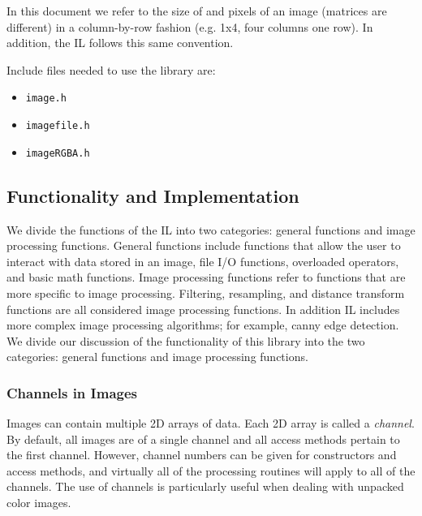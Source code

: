 In this document we refer to the size of and pixels of an image
(matrices are different) in a column-by-row fashion
(e.g. 1x4, four columns one row).
In addition, the IL follows this same convention.

Include files needed to use the library are:
\begin{itemize}
\item {\tt image.h}
\item {\tt imagefile.h}
\item {\tt imageRGBA.h}
\end{itemize}

\subsection{Functionality and Implementation}
We divide the functions of the IL into two categories: general 
functions and image processing functions.  General functions include 
functions that allow the user to interact with data stored in an 
image, file I/O functions, overloaded operators, and basic math 
functions.  Image processing functions refer to functions that are 
more specific to image processing.  Filtering, resampling, and 
distance transform functions are all considered image processing 
functions.  In addition IL includes more complex image processing 
algorithms; for example, canny edge detection.  We divide our 
discussion of the functionality of this library into the two 
categories: general functions and image processing functions.

\subsubsection{Channels in Images}
Images can contain multiple 2D arrays of data.  Each 2D array is 
called a {\em channel}.  By default, all images are of a single 
channel and all access methods pertain to the first channel.  
However, channel numbers can be given for constructors and access 
methods, and virtually all of the processing routines will apply to 
all of the channels.  The use of channels is particularly useful when 
dealing with unpacked color images.

